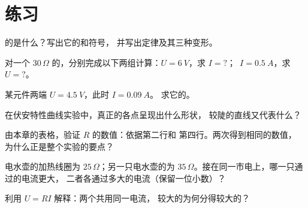 \section{练习}

\begin{exercise}[$\star$]\label{exo:g8:ohms-law:1}
的是什么？写出它的和符号，
并写出定律及其三种变形。
\end{exercise}

\begin{exercise}[$\star$]\label{exo:g8:ohms-law:2}
对一个 $30\,\Omega$ 的，分别完成以下两组计算：$U =
\qty{6}{V}$，求 $I = {?}$；\ $I = \qty{0.5}{A}$，求 $U = {?}$。
\end{exercise}

\begin{exercise}[$\star$]\label{exo:g8:ohms-law:3}
某元件两端 $U = \qty{4.5}{V}$，此时 $I = \qty{0.09}{A}$。
求它的。
\end{exercise}

\begin{exercise}[$\star$]\label{exo:g8:ohms-law:4}
在伏安特性曲线实验中，真正的各点呈现出什么形状，
较陡的直线又代表什么？
\end{exercise}

\begin{exercise}[$\star$]\label{exo:g8:ohms-law:5}
由本章的表格，验证 $R$ 的数值：依据第二行和
第四行。两次得到相同的数值，
为什么正是整个实验的要点？
\end{exercise}

\begin{exercise}[$\star$]\label{exo:g8:ohms-law:6}
电水壶的加热线圈为 $25\,\Omega$；另一只电水壶的为
$35\,\Omega$。接在同一市电上，哪一只通过的电流更大，
二者各通过多大的电流（保留一位小数）？
\end{exercise}

\begin{exercise}[$\star$]\label{exo:g8:ohms-law:7}
利用 $U = R I$ 解释：两个共用同一电流，
较大的为何分得较大的？
\end{exercise}

